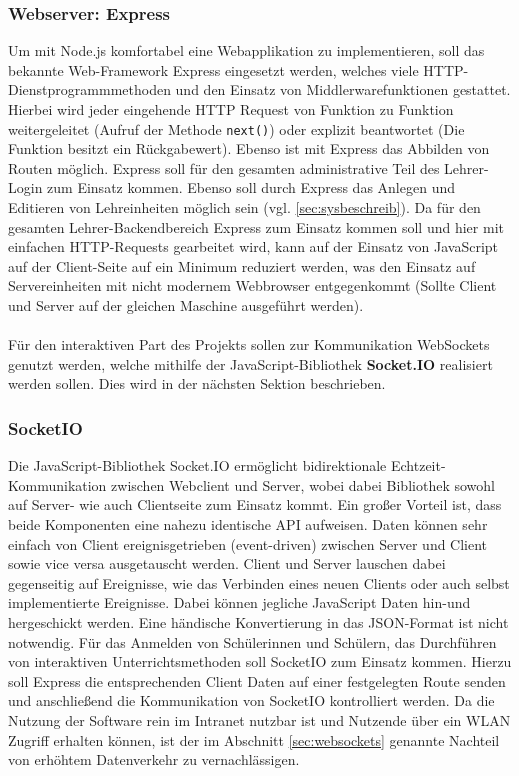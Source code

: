 \subsubsection{Webserver: Express}\label{sec:expressjs}
Um mit Node.js komfortabel eine Webapplikation zu implementieren, soll das bekannte Web-Framework Express eingesetzt werden, welches viele HTTP-Dienstprogrammmethoden und den Einsatz von Middlerwarefunktionen gestattet. Hierbei wird jeder eingehende HTTP Request von Funktion zu Funktion weitergeleitet (Aufruf der Methode \texttt{next()}) oder explizit beantwortet (Die Funktion besitzt ein Rückgabewert). Ebenso ist mit Express das Abbilden von Routen möglich. Express soll für den gesamten administrative Teil des Lehrer-Login zum Einsatz kommen. Ebenso soll durch Express das Anlegen und Editieren von Lehreinheiten möglich sein (vgl. \ref{sec:sysbeschreib}). 
Da für den gesamten Lehrer-Backendbereich Express zum Einsatz kommen soll und hier mit einfachen HTTP-Requests gearbeitet wird, kann auf der Einsatz von JavaScript auf der Client-Seite auf ein Minimum reduziert werden, was den Einsatz auf Servereinheiten mit nicht modernem Webbrowser entgegenkommt (Sollte Client und Server auf der gleichen Maschine ausgeführt werden).\\ \\ 
Für den interaktiven Part des Projekts sollen zur Kommunikation WebSockets genutzt werden, welche mithilfe der JavaScript-Bibliothek \textbf{Socket.IO} realisiert werden sollen. Dies wird in der nächsten Sektion beschrieben.   

\subsubsection{SocketIO}\label{sec:socketio}
Die JavaScript-Bibliothek Socket.IO ermöglicht bidirektionale Echtzeit-Kommunikation zwischen Webclient und Server, wobei dabei Bibliothek sowohl auf Server- wie auch Clientseite zum Einsatz kommt. Ein großer Vorteil ist, dass beide Komponenten eine nahezu identische API aufweisen. Daten können sehr einfach von Client ereignisgetrieben (event-driven) zwischen Server und Client sowie vice versa ausgetauscht werden. Client und Server lauschen dabei gegenseitig auf Ereignisse, wie das Verbinden eines neuen Clients oder auch selbst implementierte Ereignisse. Dabei können jegliche JavaScript Daten hin-und hergeschickt werden. Eine händische Konvertierung in das JSON-Format ist nicht notwendig. Für das Anmelden von Schülerinnen und Schülern, das Durchführen von interaktiven Unterrichtsmethoden soll SocketIO zum Einsatz kommen. Hierzu soll Express die entsprechenden Client Daten auf einer festgelegten Route senden und anschließend die Kommunikation von SocketIO kontrolliert werden. Da die Nutzung der Software rein im Intranet nutzbar ist und Nutzende über ein WLAN Zugriff erhalten können, ist der im Abschnitt \ref{sec:websockets} genannte Nachteil von erhöhtem Datenverkehr zu vernachlässigen.      
